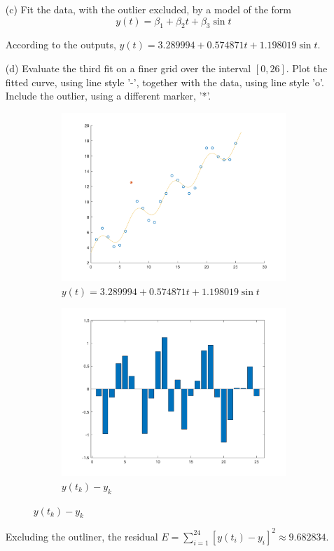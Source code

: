 \documentclass[10pt]{report}
\begin{document}
\begin{enumerate}
	\item [(c)]
	Fit the data, with the outlier excluded, by a model of the form
	\[
	y(t) = \beta_1 + \beta_2 t + \beta_3 \sin t
	\]
	
	
	According to the outputs, $y(t) = 3.289994 + 0.574871 t + 1.198019 \sin t$.
	
	\item [(d)]
	Evaluate the third fit on a finer grid over the interval $[0,26]$. Plot the fitted curve, using line style '-', together with the data, using line style 'o'. Include the outlier, using a different marker, '*'.
	
	\begin{figure}[H]
		\begin{subfigure}[b]{0.5\linewidth}
			\centering
			\includegraphics[width=\linewidth]{hw5ca1c_fit}
			\caption*{$y(t) = 3.289994 + 0.574871 t + 1.198019 \sin t$}
		\end{subfigure}
		\begin{subfigure}[b]{0.5\linewidth}
			\centering
			\includegraphics[width=\linewidth]{hw5ca1c_residual} 
			\caption*{$y(t_k)-y_k$}
		\end{subfigure}
	\end{figure}
	Excluding the outliner, the residual $E = \sum_{i=1}^{24} [y(t_i) - y_i]^2 \approx 9.682834$.
\end{enumerate}
\end{document}
